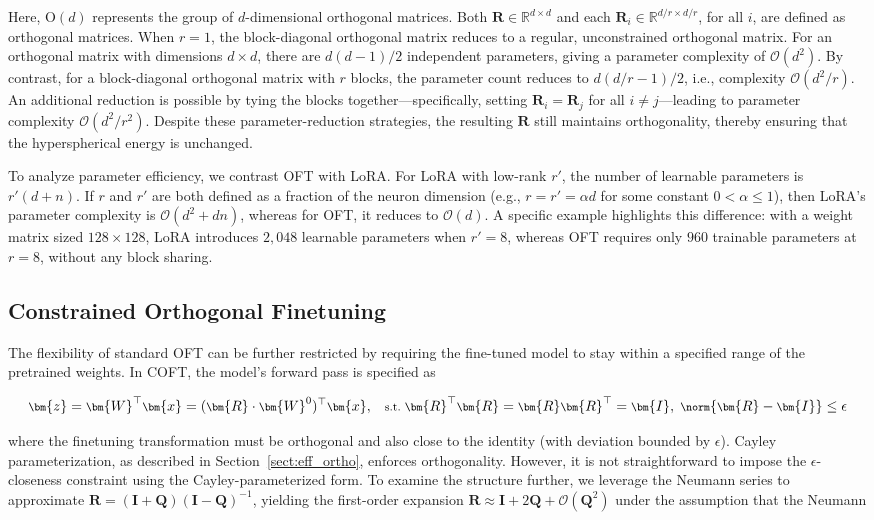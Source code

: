 Here, $\text{O}(d)$ represents the group of $d$-dimensional orthogonal matrices. Both $\bm{R}\in\mathbb{R}^{d\times d}$ and each $\bm{R}_i\in\mathbb{R}^{d/r\times d/r}$, for all $i$, are defined as orthogonal matrices. When $r=1$, the block-diagonal orthogonal matrix reduces to a regular, unconstrained orthogonal matrix. For an orthogonal matrix with dimensions $d\times d$, there are $d(d-1)/2$ independent parameters, giving a parameter complexity of $\mathcal{O}(d^2)$. By contrast, for a block-diagonal orthogonal matrix with $r$ blocks, the parameter count reduces to $d(d/r-1)/2$, i.e., complexity $\mathcal{O}(d^2/r)$. An additional reduction is possible by tying the blocks together—specifically, setting $\bm{R}_i=\bm{R}_j$ for all $i\neq j$—leading to parameter complexity $\mathcal{O}(d^2/r^2)$. Despite these parameter-reduction strategies, the resulting $\bm{R}$ still maintains orthogonality, thereby ensuring that the hyperspherical energy is unchanged.

To analyze parameter efficiency, we contrast OFT with LoRA. For LoRA with low-rank $r'$, the number of learnable parameters is $r'(d+n)$. If $r$ and $r'$ are both defined as a fraction of the neuron dimension (e.g., $r = r' = \alpha d$ for some constant $0<\alpha\leq 1$), then LoRA’s parameter complexity is $\mathcal{O}(d^2 + dn)$, whereas for OFT, it reduces to $\mathcal{O}(d)$. A specific example highlights this difference: with a weight matrix sized $128\times128$, LoRA introduces $2,048$ learnable parameters when $r'=8$, whereas OFT requires only $960$ trainable parameters at $r=8$, without any block sharing.

\subsection{Constrained Orthogonal Finetuning}

The flexibility of standard OFT can be further restricted by requiring the fine-tuned model to stay within a specified range of the pretrained weights. In COFT, the model’s forward pass is specified as

\begin{equation}\label{eq:coft_general}
    \footnotesize
    \bm{z}=\bm{W}^\top\bm{x}=(\bm{R}\cdot\bm{W}^0)^\top\bm{x},~~~\text{s.t.}~\bm{R}^\top\bm{R}=\bm{R}\bm{R}^\top=\bm{I},~\norm{\bm{R}-\bm{I}}\leq \epsilon
\end{equation}

where the finetuning transformation must be orthogonal and also close to the identity (with deviation bounded by $\epsilon$). Cayley parameterization, as described in Section~\ref{sect:eff_ortho}, enforces orthogonality. However, it is not straightforward to impose the $\epsilon$-closeness constraint using the Cayley-parameterized form. To examine the structure further, we leverage the Neumann series to approximate $\bm{R} = (\bm{I}+\bm{Q})(\bm{I}-\bm{Q})^{-1}$, yielding the first-order expansion $\bm{R} \approx \bm{I} + 2\bm{Q} + \mathcal{O}(\bm{Q}^2)$ under the assumption that the Neumann

